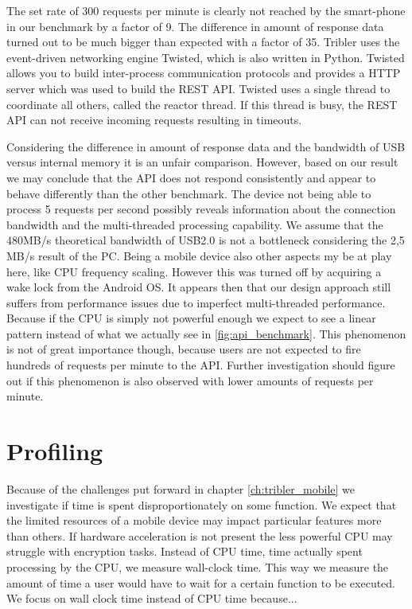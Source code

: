 The set rate of 300 requests per minute is clearly not reached by the smart-phone in our benchmark by a factor of 9.
The difference in amount of response data turned out to be much bigger than expected with a factor of 35.
Tribler uses the event-driven networking engine Twisted, which is also written in Python.
Twisted allows you to build inter-process communication protocols and provides a HTTP server which was used to build the REST API.
Twisted uses a single thread to coordinate all others, called the reactor thread.
If this thread is busy, the REST API can not receive incoming requests resulting in timeouts.

Considering the difference in amount of response data and the bandwidth of USB versus internal memory it is an unfair comparison.
However, based on our result we may conclude that the API does not respond consistently and appear to behave differently than the other benchmark.
The device not being able to process 5 requests per second possibly reveals information about the connection bandwidth and the multi-threaded processing capability.
We assume that the 480MB/s theoretical bandwidth of USB2.0 is not a bottleneck considering the 2,5 MB/s result of the PC.
Being a mobile device also other aspects my be at play here, like CPU frequency scaling.
However this was turned off by acquiring a wake lock from the Android OS.
It appears then that our design approach still suffers from performance issues due to imperfect multi-threaded performance.
Because if the CPU is simply not powerful enough we expect to see a linear pattern instead of what we actually see in \ref{fig:api_benchmark}.
This phenomenon is not of great importance though, because users are not expected to fire hundreds of requests per minute to the API.
Further investigation should figure out if this phenomenon is also observed with lower amounts of requests per minute.


\section{Profiling}
Because of the challenges put forward in chapter \ref{ch:tribler_mobile} we investigate if time is spent disproportionately on some function.
We expect that the limited resources of a mobile device may impact particular features more than others.
If hardware acceleration is not present the less powerful CPU may struggle with encryption tasks.
Instead of CPU time, time actually spent processing by the CPU, we measure wall-clock time.
This way we measure the amount of time a user would have to wait for a certain function to be executed.
We focus on wall clock time instead of CPU time because...

